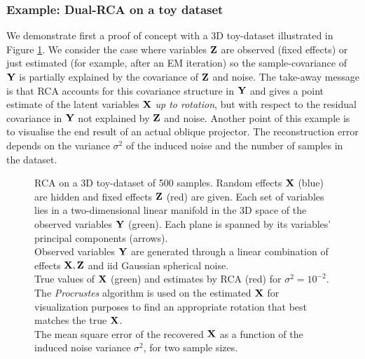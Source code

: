       \subsubsection{Example: Dual-RCA on a toy dataset} \label{subsubsec:chap3_RCA_example_toy}
	We demonstrate first a proof of concept with a 3D toy-dataset illustrated in Figure \ref{fig:rca_toy}.
	We consider the case where variables $\mathbf{Z}$ are observed (fixed effects) or just estimated (for example, after an EM iteration) so the sample-covariance of $\mathbf{Y}$ is partially explained by the covariance of $\mathbf{Z}$ and noise.
	The take-away message is that RCA accounts for this covariance structure in $\mathbf{Y}$ and gives a point estimate of the latent variables $\mathbf{X}$ \emph{up to rotation}, but with respect to the residual covariance in $\mathbf{Y}$ not explained by $\mathbf{Z}$ and noise.
	Another point of this example is to visualise the end result of an actual oblique projector.
	The reconstruction error depends on the variance $\sigma^2$ of the induced noise and the number of samples in the dataset.

	\begin{figure}[!htbp]
	  \centering
	  \caption[Example of RCA on a 3D toy-dataset.] { \label{fig:rca_toy}
	    RCA on a 3D toy-dataset of 500 samples. Random effects $\mathbf{X}$ (blue) are hidden and fixed effects $\mathbf{Z}$ (red) are given. Each set of variables lies in a two-dimensional linear manifold in the 3D space of the observed variables $\mathbf{Y}$ (green). Each plane is spanned by its variables' principal components (arrows).\\
	    \textbf{} Observed variables $\mathbf{Y}$ are generated through a linear combination of effects $\mathbf{X}, \mathbf{Z}$ and iid Gaussian spherical noise.\\
	    \textbf{} True values of $\mathbf{X}$ (green) and estimates by RCA (red) for $\sigma^2=10^{-2}$. The \textit{Procrustes} algorithm is used on the estimated $\mathbf{X}$ for visualization purposes to find an appropriate rotation that best matches the true $\mathbf{X}$.\\
	    \textbf{} The mean square error of the recovered $\mathbf{X}$ as a function of the induced noise variance $\sigma^2$, for two sample sizes.
	  }
	\end{figure}

